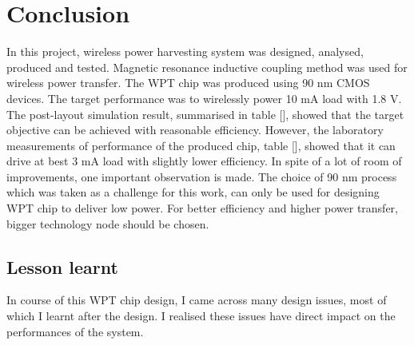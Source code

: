 \documentclass[UKenglish]{ifimaster}  %
\begin{document}
\chapter{Conclusion}
In this project, wireless power harvesting system was designed, analysed, produced and tested. Magnetic resonance inductive coupling method was used for 
wireless power transfer. The WPT chip was produced using 90 nm CMOS devices. The target performance was to wirelessly power 10 mA load with 1.8 V.   \\

The post-layout simulation result, summarised in table [], showed that the target objective can be achieved with reasonable efficiency. However, the laboratory 
measurements of performance of the produced chip, table [], showed that it can drive at best 3 mA load with slightly lower efficiency. In spite of a  lot of room of improvements, one important observation is made. The choice of 90 nm process which was taken as a challenge for this work, can only be used for designing WPT 
chip to deliver low power. For better efficiency and higher power transfer, bigger technology node should be chosen. \\


\section{Lesson learnt}

In course of this WPT chip design, I came across many design issues, most of which I learnt after the design. I realised these issues have direct impact on the performances of the system.
\end{document}
